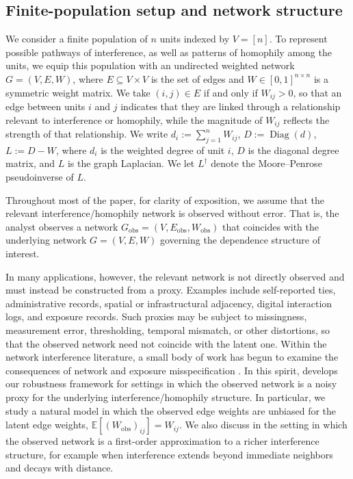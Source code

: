 \documentclass[12pt]{article}
\theoremstyle{definition}
\numberwithin{equation}{section}
\numberwithin{figure}{section}
\newcommand{\Diag}{\operatorname{Diag}}
\numberwithin{equation}{section}
\numberwithin{figure}{section}
\begin{document}
\subsection{Finite-population setup and network structure}\label{setup}\label{notation}

We consider a finite population of $n$ units indexed by $V=[n]$. To represent possible pathways of interference, as well as patterns of homophily among the units, we equip this population with an undirected weighted network 
$G=(V,E,W)$,
where $E \subseteq V\times V$ is the set of edges and $W\in[0,1]^{n\times n}$ is a symmetric weight matrix. We take $(i,j)\in E$ if and only if $W_{ij}>0$,
so that an edge between units $i$ and $j$ indicates that they are linked through a relationship relevant to interference or homophily, while the magnitude of $W_{ij}$ reflects the strength of that relationship. We write
$d_i := \sum_{j=1}^n W_{ij}$, $D := \Diag(d)$, $L := D-W$,
where $d_i$ is the weighted degree of unit $i$, $D$ is the diagonal degree matrix, and $L$ is the graph Laplacian. We let $L^\dagger$ denote the Moore--Penrose pseudoinverse of $L$.

Throughout most of the paper, for clarity of exposition, we assume that the relevant interference/homophily network is observed without error. That is, the analyst observes a network
$G_{\mathrm{obs}}=(V,E_{\mathrm{obs}},W_{\text{obs}})$
that coincides with the underlying network
$G=(V,E,W)$
governing the dependence structure of interest.

In many applications, however, the relevant network is not directly observed and must instead be constructed from a proxy. Examples include self-reported ties, administrative records, spatial or infrastructural adjacency, digital interaction logs, and exposure records. Such proxies may be subject to missingness, measurement error, thresholding, temporal mismatch, or other distortions, so that the observed network need not coincide with the latent one. Within the network interference literature, a small body of work has begun to examine the consequences of network and exposure misspecification \citep{aronow2017estimating,savje2024causal,weinstein2026causal}. In this spirit,  develops our robustness framework for settings in which the observed network is a noisy proxy for the underlying interference/homophily structure. In particular, we study a natural model in which the observed edge weights are unbiased for the latent edge weights, $\mathbb{E}[{(W_{\mathrm{obs}})}_{ij}] = W_{ij}$. 
We also discuss in  the setting in which the observed network is a first-order approximation to a richer interference structure, for example when interference extends beyond immediate neighbors and decays with distance. 
\end{document}
